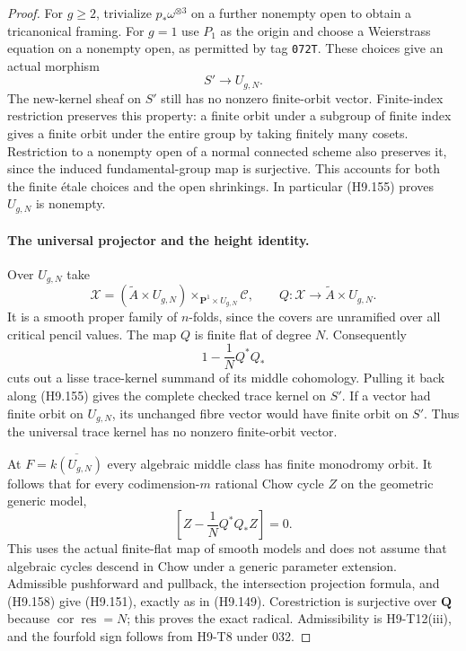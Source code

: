 \begin{proof}
For $g\ge2$, trivialize $p_*\omega^{\otimes3}$ on
a further nonempty open to obtain a tricanonical
framing. For $g=1$ use $P_1$ as the origin and
choose a Weierstrass equation on a nonempty open,
as permitted by tag \texttt{072T}. These choices
give an actual morphism
\[
                              S'\longrightarrow U_{g,N}.
                                                               \tag{H9.155}
\]
The new-kernel sheaf on $S'$ still has no nonzero
finite-orbit vector. Finite-index restriction
preserves this property: a finite orbit under
a subgroup of finite index gives a finite orbit
under the entire group by taking finitely many
cosets. Restriction to a nonempty open of a normal
connected scheme also preserves it, since the
induced fundamental-group map is surjective.
This accounts for both the finite \'etale choices
and the open shrinkings. In particular (H9.155)
proves $U_{g,N}$ is nonempty.

\paragraph{The universal projector and the height identity.}
Over $U_{g,N}$ take
\[
 \mathscr X=(\widetilde A\times U_{g,N})
                  \times_{\mathbf P^1\times U_{g,N}}\mathscr C,
 \qquad Q:\mathscr X\to\widetilde A\times U_{g,N}.
                                                               \tag{H9.156}
\]
It is a smooth proper family of $n$-folds, since
the covers are unramified over all critical pencil
values. The map $Q$ is finite flat of degree $N$.
Consequently
\[
                           1-\frac1N Q^*Q_*
                                                               \tag{H9.157}
\]
cuts out a lisse trace-kernel summand of its
middle cohomology. Pulling it back along (H9.155)
gives the complete checked trace kernel on $S'$.
If a vector had finite orbit on $U_{g,N}$, its
unchanged fibre vector would have finite orbit
on $S'$. Thus the universal trace kernel has
no nonzero finite-orbit vector.

At $F=\overline{k(U_{g,N})}$ every algebraic
middle class has finite monodromy orbit. It
follows that for every codimension-$m$ rational
Chow cycle $Z$ on the geometric generic model,
\[
                    \left[Z-\frac1NQ^*Q_*Z\right]=0.
                                                               \tag{H9.158}
\]
This uses the actual finite-flat map of smooth
models and does not assume that algebraic cycles
descend in Chow under a generic parameter
extension. Admissible pushforward and pullback,
the intersection projection formula, and (H9.158)
give (H9.151), exactly as in (H9.149).
Corestriction is surjective over $\mathbf Q$
because $\operatorname{cor}\operatorname{res}=N$;
this proves the exact radical. Admissibility is
H9-T12(iii), and the fourfold sign follows from
H9-T8 under 032.
\end{proof}

